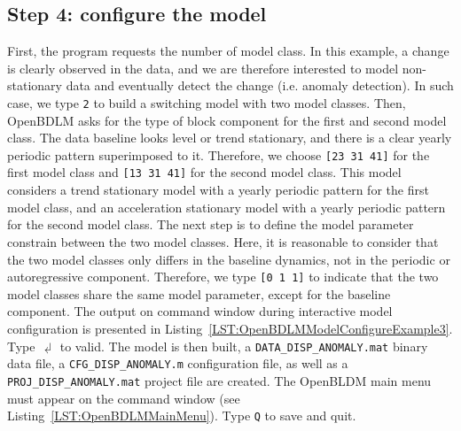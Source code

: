 \subsection{Step 4: configure the model}

First, the program requests the number of model class.
In this example, a change is clearly observed in the data, and we are therefore interested to model non-stationary data and eventually detect the change (i.e. anomaly detection).
In such case, we type \colorbox{light-gray}{\lstinline[basicstyle = \mlttfamily \small, backgroundcolor = \color{light-gray}]!2!} to build a switching model with two model classes.
Then, OpenBDLM asks for the type of block component for the first and second model class. 
The data baseline looks level or trend stationary, and there is a clear yearly periodic pattern superimposed to it.
Therefore, we choose \colorbox{light-gray}{\lstinline[basicstyle = \mlttfamily \small, backgroundcolor = \color{light-gray}]![23 31 41]!} for the first model class and \colorbox{light-gray}{\lstinline[basicstyle = \mlttfamily \small, backgroundcolor = \color{light-gray}]![13 31 41]!} for the second model class.
This model considers a trend stationary model with a yearly periodic pattern for the first model class, and an acceleration stationary model with a yearly periodic pattern for the second model class.
The next step is to define the model parameter constrain between the two model classes. 
Here, it is reasonable to consider that the two model classes only differs in the baseline dynamics, not in the periodic or autoregressive component. 
Therefore, we type \colorbox{light-gray}{\lstinline[basicstyle = \mlttfamily \small, backgroundcolor = \color{light-gray}]![0 1 1]!} to indicate that the two model classes share the same model parameter, except for the baseline component.
The  output on \MATLAB{} command window during interactive model configuration is presented in Listing~\ref{LST:OpenBDLMModelConfigureExample3}.
Type $\dlsh$ to valid.
The model is then built, a \lstinline[basicstyle = \mlttfamily \small, backgroundcolor = \color{light-gray}]!DATA_DISP_ANOMALY.mat! binary data file, a \lstinline[basicstyle = \mlttfamily \small, backgroundcolor = \color{light-gray}]!CFG_DISP_ANOMALY.m! configuration file, as well as a \lstinline[basicstyle = \mlttfamily \small, backgroundcolor = \color{light-gray}]!PROJ_DISP_ANOMALY.mat! project file are created.
The OpenBLDM main menu must appear on the \MATLAB{} command window (see Listing~\ref{LST:OpenBDLMMainMenu}).
Type \colorbox{light-gray}{\lstinline[basicstyle = \mlttfamily \small, backgroundcolor = \color{light-gray}]!Q!} to save and quit.



